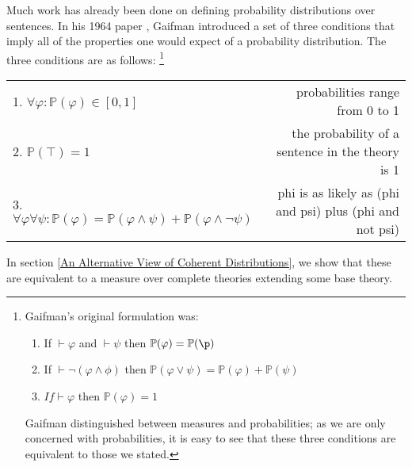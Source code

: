 \documentclass[12pt]{article}
\newcommand{\PP}{\mathbb{P}}
\theoremstyle{plain}
\theoremstyle{definition}
\theoremstyle{remark}
\begin{document}
Much work has already been done on defining probability distributions over sentences. In his 1964 paper \cite{gaifman64}, Gaifman introduced a set of three conditions that imply all of the properties one would expect of a probability distribution. The three conditions are as follows:
\footnote{Gaifman's original formulation was:
\begin{enumerate}
\item If $\vdash \varphi$ and $\vdash \psi$ then $\PP(\varphi)=\PP(\p)$
\item If $\vdash \neg (\varphi \wedge \phi)$ then $\PP(\varphi \vee \psi) = \PP(\varphi) + \PP(\psi)$
\item $If \vdash \varphi$ then $\PP(\varphi) = 1$
\end{enumerate}
Gaifman distinguished between measures and probabilities; as we are only concerned with probabilities, it is easy to see that these three conditions are equivalent to those we stated.
}
\begin{center}
\begin{tabular}{l r}
1. $\forall \varphi: \PP(\varphi) \in [0,1]$ & probabilities range from 0 to 1 \\
2. $\PP(\top) = 1$ & the probability of a sentence in the theory is 1 \\
3. $\forall \varphi \forall \psi: \PP(\varphi) = \PP(\varphi \wedge \psi) + \PP(\varphi \wedge \neg \psi)$ & phi is as likely as (phi and psi) plus (phi and not psi)
\end{tabular}
\end{center}

In section \ref{An Alternative View of Coherent Distributions}, we show that these are equivalent to a measure over complete theories extending some base theory.


% 

\end{document}
